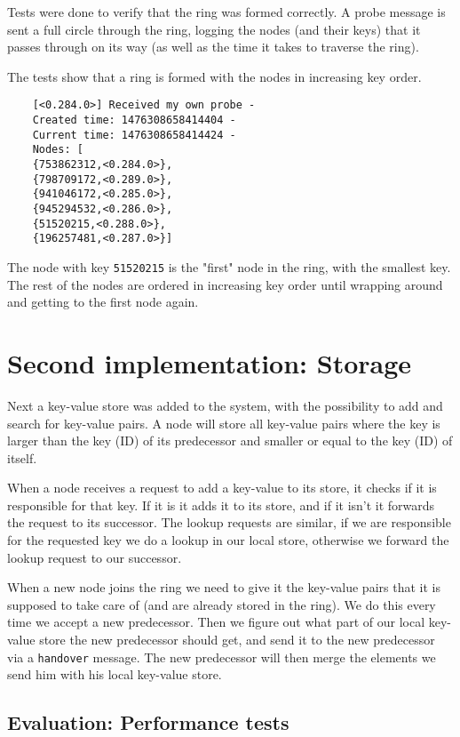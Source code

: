 \documentclass[a4paper, 11pt]{article}
\begin{document}
Tests were done to verify that the ring was formed correctly. A probe message is sent a full circle through the ring, logging the nodes (and their keys) that it passes through on its way (as well as the time it takes to traverse the ring).

The tests show that a ring is formed with the nodes in increasing key order.

\begin{verbatim}
    [<0.284.0>] Received my own probe - 
    Created time: 1476308658414404 - 
    Current time: 1476308658414424 - 
    Nodes: [
    {753862312,<0.284.0>},
    {798709172,<0.289.0>},
    {941046172,<0.285.0>},
    {945294532,<0.286.0>},
    {51520215,<0.288.0>},
    {196257481,<0.287.0>}]
\end{verbatim}

The node with key \texttt{51520215} is the "first" node in the ring, with the smallest key. The rest of the nodes are ordered in increasing key order until wrapping around and getting to the first node again.

\section{Second implementation: Storage}

Next a key-value store was added to the system, with the possibility to add and search for key-value pairs. A node will store all key-value pairs where the key is larger than the key (ID) of its predecessor and smaller or equal to the key (ID) of itself.

When a node receives a request to add a key-value to its store, it checks if it is responsible for that key. If it is it adds it to its store, and if it isn't it forwards the request to its successor. The lookup requests are similar, if we are responsible for the requested key we do a lookup in our local store, otherwise we forward the lookup request to our successor.

When a new node joins the ring we need to give it the key-value pairs that it is supposed to take care of (and are already stored in the ring). We do this every time we accept a new predecessor. Then we figure out what part of our local key-value store the new predecessor should get, and send it to the new predecessor via a \texttt{handover} message. The new predecessor will then merge the elements we send him with his local key-value store.

\subsection{Evaluation: Performance tests}
\end{document}
